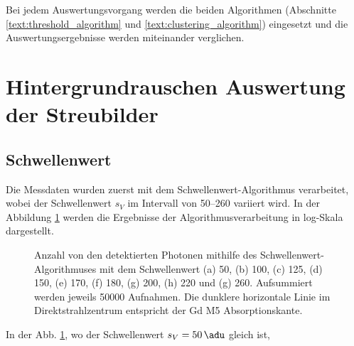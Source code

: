 \noindent
Bei jedem Auswertungsvorgang werden die beiden Algorithmen (Abschnitte \ref{text:threshold_algorithm} und \ref{text:clustering_algorithm}) eingesetzt und die Auswertungsergebnisse werden miteinander verglichen.
\section{Hintergrundrauschen Auswertung der Streubilder}
\label{text:streuung_counting}
\subsection{Schwellenwert}
Die Messdaten wurden zuerst mit dem Schwellenwert-Algorithmus verarbeitet, wobei der Schwellenwert $s_V$ im Intervall von \SIrange{50}{260}{\adu} variiert wird. In der Abbildung \ref{fig:th_50_100_125_150_170_180_200_220_260} werden die Ergebnisse der Algorithmusverarbeitung in log-Skala dargestellt.
\begin{figure}[H]
    \centering
    
    \caption{Anzahl von den detektierten Photonen mithilfe des Schwellenwert-Algorithmuses mit dem Schwellenwert (a) \SI{50}{\adu}, (b) \SI{100}{\adu}, (c) \SI{125}{\adu}, (d) \SI{150}{\adu}, (e) \SI{170}{\adu}, (f) \SI{180}{\adu}, (g) \SI{200}{\adu}, (h) \SI{220}{\adu} und (g) \SI{260}{\adu}. Aufsummiert werden jeweils \num{50000} Aufnahmen. Die dunklere horizontale Linie im Direktstrahlzentrum entspricht der Gd M5 Absorptionskante.}
    \label{fig:th_50_100_125_150_170_180_200_220_260}
\end{figure}
%     
\noindent
In der Abb. \ref{fig:th_50_100_125_150_170_180_200_220_260}, wo der Schwellenwert $s_V = \SI{50}{\adu}$ gleich ist, 

